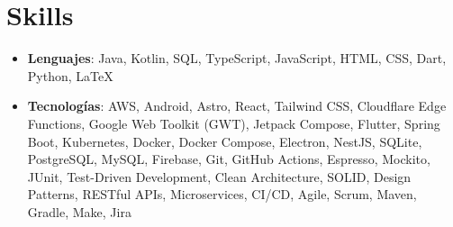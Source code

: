 \documentclass[letterpaper,11pt]{article}
\newcommand{\resumeSubHeadingListStart}{\begin{itemize}[leftmargin=*]}
\newcommand{\resumeSubHeadingListEnd}{\end{itemize}}
\begin{document}
\section{Skills}
\resumeSubHeadingListStart
\item{
            \textbf{Lenguajes}{: Java, Kotlin, SQL, TypeScript, JavaScript, HTML, CSS, Dart, Python, LaTeX}

      }
\item {
            \textbf{Tecnologías}{: AWS, Android, Astro, React, Tailwind CSS, Cloudflare Edge Functions, Google Web Toolkit (GWT), Jetpack Compose, Flutter, Spring Boot, Kubernetes, Docker, Docker Compose, Electron, NestJS, SQLite, PostgreSQL, MySQL, Firebase, Git, GitHub Actions, Espresso, Mockito, JUnit, Test-Driven Development, Clean Architecture, SOLID, Design Patterns, RESTful APIs, Microservices, CI/CD, Agile, Scrum, Maven, Gradle, Make, Jira}
      }
\resumeSubHeadingListEnd


\end{document}
